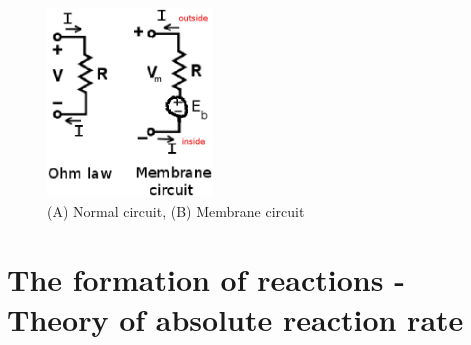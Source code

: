\begin{figure}[htb]
  \centerline{\includegraphics[height=5cm]{./images/Ohm_membrane_circuit.eps}}
  \caption{(A) Normal circuit, (B) Membrane circuit}\label{fig:Ohm_circuit}
\end{figure}



\section{The formation of reactions - Theory of absolute reaction rate}
\label{sec:form-react-theory}






